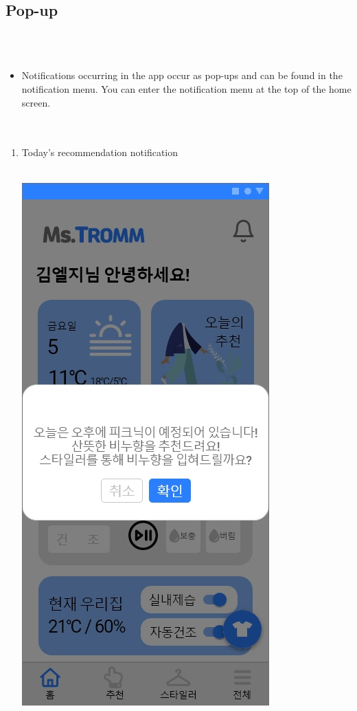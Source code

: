 \documentclass[conference]{IEEEtran}
\begin{document}
\subsection{Pop-up} \\ \\
\begin{itemize}
    \item[] Notifications occurring in the app occur as pop-ups and can be found in the notification menu. You can enter the notification menu at the top of the home screen.\\ \\ \\
\end{itemize}

\begin{enumerate}
    \item Today's recommendation notification \\ \\
        \centerline{\includegraphics[scale=0.24]{assets/오늘의 추천 팝업1.jpg}
}
\end{enumerate}
\end{document}
